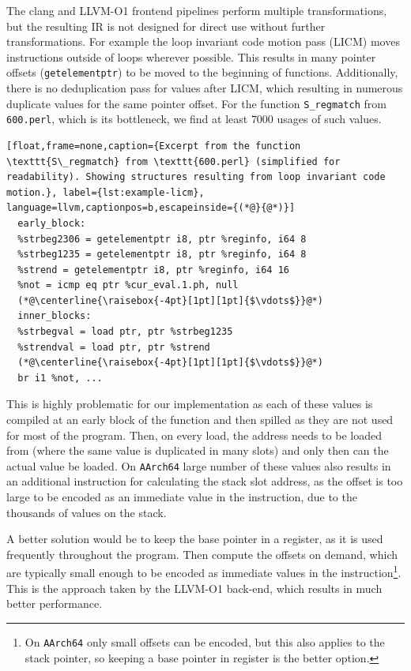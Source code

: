 The clang and LLVM-O1 frontend pipelines perform multiple transformations, but the resulting IR is not designed for direct use without further transformations. For example the loop invariant code motion pass (LICM) moves instructions outside of loops wherever possible. This results in many pointer offsets (\texttt{getelementptr}) to be moved to the beginning of functions. Additionally, there is no deduplication pass for values after LICM, which resulting in numerous duplicate values  for the same pointer offset. For the function \texttt{S\_regmatch} from \texttt{600.perl}, which is its bottleneck, we find at least $7000$ usages of such values.

\begin{lstlisting}[float,frame=none,caption={Excerpt from the function \texttt{S\_regmatch} from \texttt{600.perl} (simplified for readability). Showing structures resulting from loop invariant code motion.}, label={lst:example-licm}, language=llvm,captionpos=b,escapeinside={(*@}{@*)}]
  early_block:
  %strbeg2306 = getelementptr i8, ptr %reginfo, i64 8
  %strbeg1235 = getelementptr i8, ptr %reginfo, i64 8
  %strend = getelementptr i8, ptr %reginfo, i64 16
  %not = icmp eq ptr %cur_eval.1.ph, null
  (*@\centerline{\raisebox{-4pt}[1pt][1pt]{$\vdots$}}@*)
  inner_blocks:
  %strbegval = load ptr, ptr %strbeg1235
  %strendval = load ptr, ptr %strend
  (*@\centerline{\raisebox{-4pt}[1pt][1pt]{$\vdots$}}@*)
  br i1 %not, ...
\end{lstlisting}

This is highly problematic for our implementation as each of these values is compiled at an early block of the function and then spilled as they are not used for most of the program. Then, on every load, the address needs to be loaded from (where the same value is duplicated in many slots) and only then can the actual value be loaded. On \texttt{AArch64}  large number of these values  also results in an additional instruction for calculating the stack slot address, as the offset is too large to be encoded as an immediate value in the instruction, due to the thousands of values on the stack.

A better solution would be to keep the base pointer in a register, as it is used frequently throughout the program. Then compute the offsets on demand, which are typically small enough to be encoded as immediate values in the instruction\footnote{On \texttt{AArch64} only small offsets can be encoded, but this also applies to the stack pointer, so keeping a base pointer in register is the better option.}. This is the approach taken by the LLVM-O1 back-end, which results in much better performance. 

